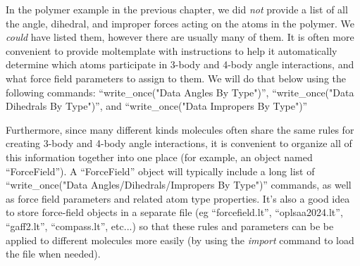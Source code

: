 \documentclass[11pt]{article}
\begin{document}
In the polymer example in the previous chapter,
we did \textit{not} provide a list of all the
angle, dihedral, and improper forces acting on the atoms in the polymer.
We \textit{could} have listed them, however there are usually many of them.
It is often more convenient to provide
moltemplate with instructions to help it automatically determine
which atoms participate in 3-body and 4-body angle interactions,
and what force field parameters to assign to them.
We will do that below using the following commands:
``write\_once("Data Angles By Type")'',
``write\_once("Data Dihedrals By Type")'', and
``write\_once("Data Impropers By Type")''


Furthermore, since many different kinds molecules often share
the same rules for creating 3-body and 4-body angle interactions,
it is convenient to organize all of this information
together into one place (for example, an object named ``ForceField'').
A ``ForceField'' object will typically include a long list of
``write\_once("Data Angles/Dihedrals/Impropers By Type")''
commands,
as well as force field parameters and related atom type properties.
It's also a good idea to store force-field objects in a separate file
(eg ``forcefield.lt'', ``oplsaa2024.lt'', ``gaff2.lt'', ``compass.lt'', etc...)
so that these rules and parameters can be be applied to different molecules
more easily (by using the \textit{import} command to load the file when needed).
\end{document}
